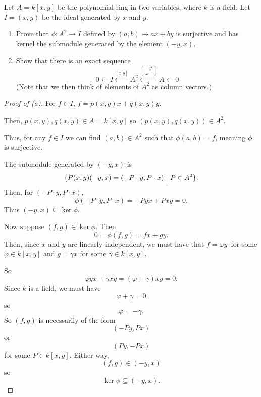 \documentclass[11pt]{article}
\begin{document}
\begin{prob}
    Let $A = k[x,y]$ be the polynomial ring in 
    two variables, where $k$ is a field. 
    Let $I = (x,y)$ be the ideal generated by 
    $x$ and $y$. 

    \begin{enumerate}[label=\alph*)]
        \item Prove that $\phi : A^2 \to I$ defined by 
            $(a,b) \mapsto ax + by$ is surjective and 
            has kernel the submodule generated 
            by the element $(-y,x)$. 
        \item Show that there is an exact sequence 
            \[
                0 \leftarrow I \overset{[x \ y]}\longleftarrow  
                A^2 
                \overset{\begin{bmatrix} -y \\ x \end{bmatrix}}
                \longleftarrow
                A \leftarrow 0
            \]
            (Note that we then think of elements of $A^2$ as 
            column vectors.)
    \end{enumerate}
\end{prob}
\begin{proof}[Proof of (a)]
    For $f \in I$, 
    $f = p(x,y)x + q(x,y)y$.  

    Then, $p(x,y), q(x,y) \in A = k[x,y]$ so 
    $(p(x,y), q(x,y)) \in A^2$. 

    Thus, for any $f \in I$ we can find 
    $(a,b) \in A^2$ such that $\phi(a,b) = f$, meaning 
    $\phi$ is surjective. 

    The submodule generated by $(-y,x)$ is 
    \[
        \{P(x,y)(-y,x) = (-P\cdot y,P\cdot x) \bigm| P \in A^2\}. 
    \]
    Then, for $(-P \cdot y, P \cdot x)$, 
    \[
        \phi(-P\cdot y, P\cdot x) = -Pyx + Pxy = 0. 
    \]
    Thus $(-y,x) \subseteq \ker \phi$. 

    Now suppose $(f,g) \in \ker \phi$. Then 
    \[
        0 = \phi(f,g) = fx + gy.  
    \]
    Then, since $x$ and $y$ are linearly independent, 
    we must have that $f = \varphi y$ for 
    some $\varphi \in k[x,y]$ and $g = \gamma x$ for 
    some $\gamma \in k[x,y]$. 

    So 
    \[
        \varphi yx + \gamma xy = (\varphi + \gamma)xy = 0.
    \]
    Since $k$ is a field, we must have 
    \[
        \varphi + \gamma = 0
    \]
    so 
    \[
        \varphi = -\gamma. 
    \]
    So $(f,g)$ is necessarily of the form 
    \[
        (-Py, Px) 
    \]
    or 
    \[
        (Py, -Px)
    \]
    for some $P \in k[x,y]$. Either way, 
    \[
        (f,g) \in (-y,x) 
    \]
    so 
    \[
        \ker \phi \subseteq (-y,x). 
    \]
\end{proof}
\end{document}
